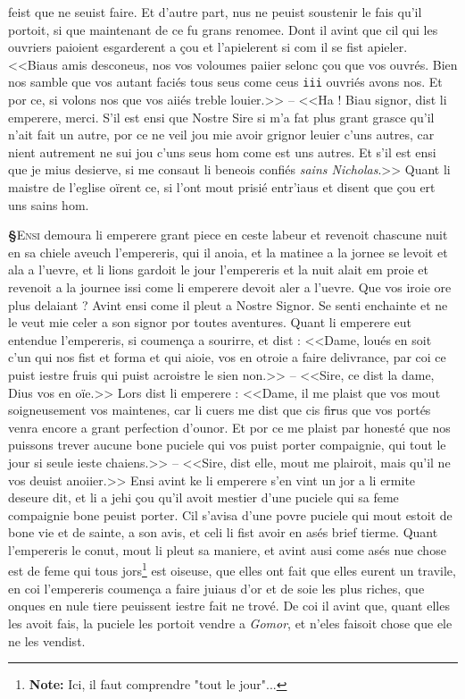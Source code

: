 \documentclass[12pt]{article} %
\newcommand{\colmar}[1]{\marginnote{[#1]}}          %
\newcommand{\persName}[1]{\emph{#1}} %
\newcommand{\placeName}[1]{\emph{#1}} %
\newcommand{\num}[1]{\texttt{#1}}    %
\newcommand{\supplied}[1]{\textlangle#1\textrangle} %
\newcommand{\fnnote}[1]{\footnote{\textbf{Note:} #1}} %
\newcommand{\del}[1]{\sout{#1}}      %
\newcounter{paranum}
\newcommand{\pnum}{\stepcounter{paranum}\textbf{§\arabic{paranum}}\quad}
\begin{document}
feist que ne seuist faire. Et d'a\supplied{u}tre part, nus ne peuist soustenir le fais qu'il portoit, si que maintenant de ce fu grans renomee. Dont il avint que cil qui les ouvriers paioient esgarderent a çou et l'apielerent si com il se fist apieler. <<Biaus amis desconeus, nos vos voloumes paiier selonc çou que vos ouvrés. Bien nos samble que vos autant faciés tous seus come ceus \num{iii} ouvriés avons nos. Et por ce, si volons nos que vos aiiés treble louier.>> -- <<Ha ! Biau signor, dist li emperere, merci. S'il est ensi que Nostre Sire si m'a fat plus grant grasce qu'il n'ait fait un autre, por ce ne veil jou mie avoir grignor leuier c'uns autres, car nient autrement ne sui jou c'uns seus hom come est uns autres. Et s'il est ensi que je mius desierve, si me consaut li beneois confiés \persName{sains Nicholas}.>> Quant li maistre de l'eglise oïrent ce, si l'ont mout prisié entr'iaus et disent que çou ert uns sains hom.


\pnum \lettrine[lines=2]{\color{darkred}E}{nsi} demoura li emperere grant piece en ceste labeur et revenoit chascune nuit en sa chiele aveuch l'empereris, qui il anoia, et la matinee a la jornee se levoit et ala a l'uevre, et li lions gardoit le jour l'empereris et la nuit alait em proie et revenoit a la journee issi come li emperere devoit aler a l'uevre. Que vos iroie ore plus delaiant ? Avint ensi come il pleut a Nostre Signor. Se senti enchainte et ne le veut mie celer a son signor por toutes aventures. \colmar{9vb}\colmar{b} Quant li emperere eut entendue l'empereris, si coumença a sourirre, et dist : <<Dame, loués en soit c'un qui nos fist et forma et qui aioie, vos en otroie a faire delivrance, par coi ce puist iestre fruis qui puist acroistre le sien non.>> -- <<Sire, ce dist la dame, Dius vos en oïe.>> Lors dist li emperere : <<Dame, il me plaist que vos mout soigneusement vos maintenes, car li cuers me dist que cis fi\del{r}us que vos portés venra encore a grant perfection d'ounor. Et por ce me plaist par honesté que nos puissons trever aucune bone puciele qui vos puist porter compaignie, qui tout le jour si seule ieste chaiens.>> -- <<Sire, dist elle, mout me plairoit, mais qu'il ne vos deuist anoiier.>> Ensi avint ke li emperere s'en vint un jor a li ermite deseure dit, et li a jehi çou qu'il avoit mestier d'une puciele qui sa feme compaignie bone peuist porter. Cil s'avisa d'une povre puciele qui mout estoit de bone vie et de sainte, a son avis, et celi li fist avoir en asés brief tierme. Quant l'empereris le conut, mout li pleut sa maniere, et avint ausi come asés nue chose est de feme qui tous jors\fnnote{Ici, il faut comprendre "tout le jour"...} est oiseuse, que elles ont fait que elles eurent un travile, en coi l'empereris coumença a faire juiaus d'or et de soie les plus riches, que onques en nule tiere peuissent iestre fait ne trové. De coi il avint que, quant elles les avoit fais, la puciele les portoit vendre a \placeName{Gomor}, et n'eles faisoit chose que ele ne les vendist.
\end{document}
